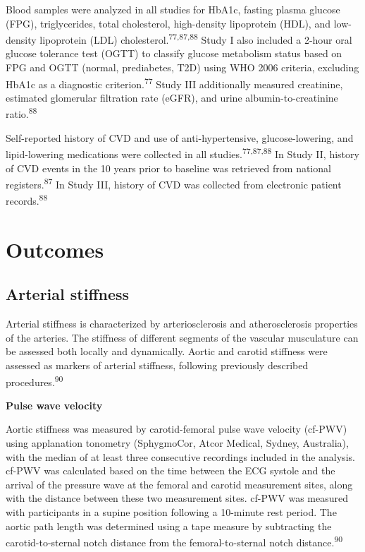 \documentclass[
  a4paper,
  headsepline=true,
  open=any]{scrbook}
\begin{document}
Blood samples were analyzed in all studies for HbA1c, fasting plasma
glucose (FPG), triglycerides, total cholesterol, high-density
lipoprotein (HDL), and low-density lipoprotein (LDL)
cholesterol.\textsuperscript{77,87,88} Study I also included a 2-hour
oral glucose tolerance test (OGTT) to classify glucose metabolism status
based on FPG and OGTT (normal, prediabetes, T2D) using WHO 2006
criteria, excluding HbA1c as a diagnostic criterion.\textsuperscript{77}
Study III additionally measured creatinine, estimated glomerular
filtration rate (eGFR), and urine albumin-to-creatinine
ratio.\textsuperscript{88}

Self-reported history of CVD and use of anti-hypertensive,
glucose-lowering, and lipid-lowering medications were collected in all
studies.\textsuperscript{77,87,88} In Study II, history of CVD events in
the 10 years prior to baseline was retrieved from national
registers.\textsuperscript{87} In Study III, history of CVD was
collected from electronic patient records.\textsuperscript{88}

\hypertarget{outcomes}{%
\section{Outcomes}\label{outcomes}}

\hypertarget{arterial-stiffness}{%
\subsection{Arterial stiffness}\label{arterial-stiffness}}

Arterial stiffness is characterized by arteriosclerosis and
atherosclerosis properties of the arteries. The stiffness of different
segments of the vascular musculature can be assessed both locally and
dynamically. Aortic and carotid stiffness were assessed as markers of
arterial stiffness, following previously described
procedures.\textsuperscript{90}

\textbf{Pulse wave velocity}

Aortic stiffness was measured by carotid-femoral pulse wave velocity
(cf-PWV) using applanation tonometry (SphygmoCor, Atcor Medical, Sydney,
Australia), with the median of at least three consecutive recordings
included in the analysis. cf-PWV was calculated based on the time
between the ECG systole and the arrival of the pressure wave at the
femoral and carotid measurement sites, along with the distance between
these two measurement sites. cf-PWV was measured with participants in a
supine position following a 10-minute rest period. The aortic path
length was determined using a tape measure by subtracting the
carotid-to-sternal notch distance from the femoral-to-sternal notch
distance.\textsuperscript{90}
\end{document}
